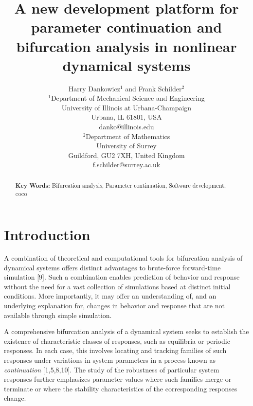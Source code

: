 \documentclass{article}
\begin{document}
\title{A new development platform for parameter continuation and bifurcation
analysis in nonlinear dynamical systems}
\author{Harry Dankowicz$^{1}$ and Frank Schilder$^{2}$ \\
$^{1}$Department of Mechanical Science and Engineering \\
University of Illinois at Urbana-Champaign \\
Urbana, IL 61801, USA \\
danko@illinois.edu \\
$^{2}$Department of Mathematics \\
University of Surrey \\
Guildford, GU2 7XH, United Kingdom \\
f.schilder@surrey.ac.uk}
\maketitle

\begin{abstract}
\textbf{Key Words:} Bifurcation analysis, Parameter continuation, Software
development, \textsc{coco}
\end{abstract}

\section{Introduction}

A combination of theoretical and computational tools for bifurcation
analysis of dynamical systems offers distinct advantages to brute-force
forward-time simulation [9]. Such a combination enables prediction of
behavior and response without the need for a vast collection of simulations
based at distinct initial conditions. More importantly, it may offer an
understanding of, and an underlying explanation for, changes in behavior and
response that are not available through simple simulation.

A comprehensive bifurcation analysis of a dynamical system seeks to
establish the existence of characteristic classes of responses, such as
equilibria or periodic responses. In each case, this involves locating and
tracking families of such responses under variations in system parameters in
a process known as \emph{continuation} [1,5,8,10]. The study of the
robustness of particular system responses further emphasizes parameter
values where such families merge or terminate or where the stability
characteristics of the corresponding responses change.
\end{document}

